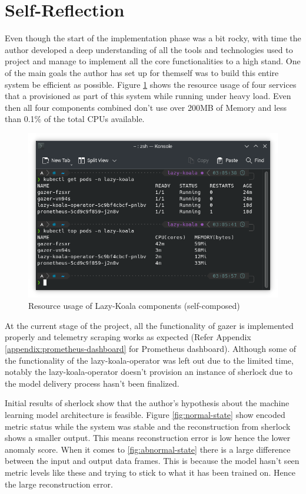 \section{Self-Reflection}

Even though the start of the implementation phase was a bit rocky, with time the author developed a deep understanding of all the tools and technologies used to project and manage to implement all the core functionalities to a high stand. One of the main goals the author has set up for themself was to build this entire system be efficient as possible. Figure \ref{fig:service-benchmark} shows the resource usage of four services that a provisioned as part of this system while running under heavy load. Even then all four components combined don't use over 200MB of Memory and less than 0.1\% of the total CPUs available.

\begin{figure}[H]
    \includegraphics[width=15cm]{assets/implementation/service-benchmark.png}
    \caption{Resource usage of Lazy-Koala components (self-composed)}
    \label{fig:service-benchmark}
\end{figure}

At the current stage of the project, all the functionality of \ac{gazer} is implemented properly and telemetry scraping works as expected (Refer Appendix \ref{appendix:prometheus-dashboard} for Prometheus dashboard). Although some of the functionality of the \ac{lazy-koala-operator} was left out due to the limited time, notably the \ac{lazy-koala-operator} doesn't provision an instance of \ac{sherlock} due to the model delivery process hasn't been finalized.

Initial results of \ac{sherlock} show that the author's hypothesis about the machine learning model architecture is feasible. Figure \ref{fig:normal-state} show encoded metric status while the system was stable and the reconstruction from \ac{sherlock} shows a smaller output. This means reconstruction error is low hence the lower anomaly score. When it comes to \ref{fig:abnormal-state} there is a large difference between the input and output data frames. This is because the model hasn't seen metric levels like these and trying to stick to what it has been trained on. Hence the large reconstruction error.

